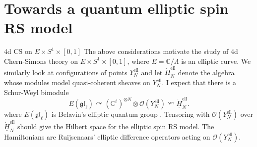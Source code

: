 \documentclass[11pt]{beamer}
\theoremstyle{remark}
\theoremstyle{remark}
\newcommand{\C}{\mathbb{C}}
\begin{document}
\section{Towards a quantum elliptic spin RS model}

\begin{frame}{4d CS on $E \times S^1 \times [0,1]$}
The above considerations motivate the study of 4d Chern-Simons theory on $E \times S^1 \times [0,1]$, where $E = \C/\Lambda$ is an elliptic curve. We similarly look at configurations of points $Y_N^\text{ell}$ and let $\underline{\dot H}_N^\text{ell}$ denote the algebra whose modules model quasi-coherent sheaves on $Y_N^\text{ell}$. I expect that there is a Schur-Weyl bimodule
\begin{equation*}
E(\mathfrak{gl}_\ell) \curvearrowright (\C^\ell)^{\otimes N} \otimes \mathcal{O}(Y_N^\text{ell}) \curvearrowleft \underline{\dot H}_N^\text{ell}.
\end{equation*}
where $E(\mathfrak{gl}_\ell)$ is Belavin's elliptic quantum group \cite{article:costello:2018b,article:etingof:1998}. Tensoring with $\mathcal{O}(Y_N^\text{ell})$ over $\underline{\dot H}_N^\text{ell}$ should give the Hilbert space for the elliptic spin RS model. The Hamiltonians are Ruijsenaars' elliptic difference operators acting on $\mathcal{O}(Y_N^\text{ell})$.
\end{frame}

\begin{frame}[allowframebreaks]


\end{frame}
\end{document}
